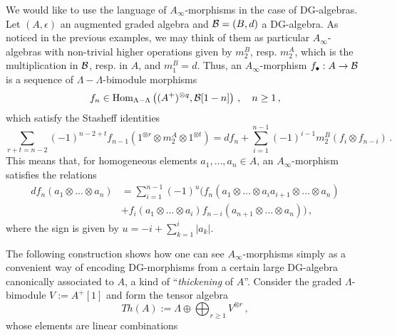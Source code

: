 	We would like to use the language of $A_{\infty}$-morphisms in 
	the case of DG-algebras. Let $(A,\epsilon)$ an augmented graded algebra
	and $\mathcal{B} = (B,d)$ a DG-algebra. As noticed in the previous examples,
	we may think of them as particular $A_{\infty}$-algebras 
	with non-trivial higher operations given by
	$m_{2}^{B}$, resp. $m_{2}^{A}$, which is the multiplication in $\mathcal{B}$, resp. in $A$,
	and $m_{1}^{B}=d$. Thus, an $A_{\infty}$-morphism $f_{\bullet}:A \to \mathcal{B}$
	is a sequence of $\Lambda-\Lambda$-bimodule morphisms 
	\begin{equation*}
		f_{n} \in \operatorname{Hom}_{\Lambda-\Lambda}\left( (A^{+})^{\otimes q}, \mathcal{B}[1-n] \right)\,, \quad n \ge 1\,,
	\end{equation*}
	which satisfy the Stasheff identities
	\begin{equation*}
		\sum_{r+t=n-2} (-1)^{n-2+t} f_{n-1}(1^{\otimes r} \otimes m_{2}^{A} \otimes 1^{\otimes t}) 
		= df_{n}
		+ \sum_{i=1}^{n-1} (-1)^{i-1} m_{2}^{B}(f_{i}\otimes f_{n-i})\,.
	\end{equation*}
	This means that, for homogeneous elements $a_{1}, \dots, a_{n} \in A$, 
	an $A_{\infty}$-morphism satisfies the relations
	\begin{align*}
		df_{n}(a_{1} \otimes \dots \otimes a_{n})
		&= \sum_{i=1}^{n-1} (-1)^{u} 
		\Big( f_{n}(a_{1} \otimes \dots \otimes a_{i}a_{i+1} \otimes \dots \otimes a_{n} ) \\
		&+ f_{i}(a_{1} \otimes \dots \otimes a_{i})f_{n-i}(a_{n+1} \otimes 
		\dots \otimes a_{n}) \Big)\,,
	\end{align*}
	where the sign is given by $u = -i + \sum_{k=1}^{i}|a_{k}|$.
	
	The following construction shows how one can see $A_{\infty}$-morphisms 
	simply as a convenient way of encoding DG-morphisms from a certain large 
	DG-algebra canonically associated to $A$, a kind of ``\emph{thickening} of $A$''.
	Consider the graded $\Lambda$-bimodule $V:=A^{+}[1]$ and form the 
	tensor algebra 
	\begin{equation*}
		Th(A) := \Lambda \oplus \bigoplus_{r \ge 1} V^{\otimes r}\,,
	\end{equation*}
	whose elements are linear combinations
	
	
	
	
	
	
	
	
	
	
	
	
	
	
	
	
	
	
	
	
	
	
	
	
	
	
	
	
	
	
	
	
	
	
	
	
	
	
	
	
	
	
	
